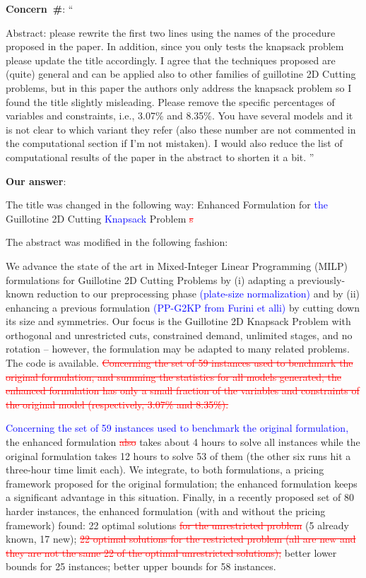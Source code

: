\documentclass[smallextended]{svjour3}       %
\makeatletter
\newif\iffinalversion
\newcommand{\newtext}[1]{\iffinalversion%
#1%
\else%
\textcolor{blue}{#1}%
\fi%
}
\newcommand{\oldtext}[1]{\iffinalversion%
#1%
\else%
\textcolor{red}{\sout{#1}}%
\fi%
}
\newcommand\gobblepars{%
    \@ifnextchar\par%
        {\expandafter\gobblepars\@gobble}%
        {}}
\newcounter{concern}
\newenvironment{concern}{%
    \refstepcounter{concern}\par\smallskip\noindent%
    \textbf{Concern~\#\theconcern}: ``\itshape\gobblepars}%
    {\unskip''\smallskip}
\newcounter{answer}
\newenvironment{answer}{%
    \refstepcounter{answer}\par\smallskip\noindent%
    \textbf{Our answer}: \gobblepars}%
    {\unskip\bigskip}
\makeatother
\begin{document}
\begin{concern}
Abstract: please rewrite the first two lines using the names of the procedure proposed in the paper. In addition, since you only tests the knapsack problem please update the title accordingly. I agree that the techniques proposed are (quite) general and can be applied also to other families of guillotine 2D Cutting problems, but in this paper the authors only address the knapsack problem so I found the title slightly misleading. Please remove the specific percentages of variables and constraints, i.e., 3.07\% and 8.35\%. You have several models and it is not clear to which variant they refer (also these number are not commented in the computational section if I’m not mistaken). I would also reduce the list of computational results of the paper in the abstract to shorten it a bit.
\end{concern}
\begin{answer}
The title was changed in the following way: Enhanced Formulation for \newtext{the} Guillotine 2D Cutting \newtext{Knapsack} Problem\oldtext{s}

The abstract was modified in the following fashion:

We advance the state of the art in Mixed-Integer Linear Programming (MILP) formulations for Guillotine 2D Cutting Problems by (i) adapting a previously-known reduction to our preprocessing phase \newtext{(plate-size normalization)} and by (ii) enhancing a previous formulation \newtext{(PP-G2KP from Furini et alli)} by cutting down its size and symmetries.
Our focus is the Guillotine 2D Knapsack Problem with orthogonal and unrestricted cuts, constrained demand, unlimited stages, and no rotation -- however, the formulation may be adapted to many related problems.
The code is available.
\oldtext{Concerning the set of 59 instances used to benchmark the original formulation, and summing the statistics for all models generated, the enhanced formulation has only a small fraction of the variables and constraints of the original model (respectively, 3.07\% and 8.35\%).}
\newtext{Concerning the set of 59 instances used to benchmark the original formulation,} the enhanced formulation \oldtext{also} takes about 4 hours to solve all instances while the original formulation takes 12 hours to solve 53 of them (the other six runs hit a three-hour time limit each).
We integrate, to both formulations, a pricing framework proposed for the original formulation; the enhanced formulation keeps a significant advantage in this situation.
Finally, in a recently proposed set of 80 harder instances, the enhanced formulation (with and without the pricing framework) found: 22 optimal solutions \oldtext{for the unrestricted problem} (5 already known, 17 new); \oldtext{22 optimal solutions for the restricted problem (all are new and they are not the same 22 of the optimal unrestricted solutions);} better lower bounds for 25 instances; better upper bounds for 58 instances.

\end{answer}
\end{document}
